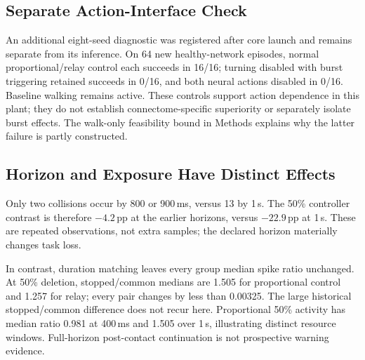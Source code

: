 \subsection{Separate Action-Interface Check}
An additional eight-seed diagnostic was registered after core launch and remains separate from its inference. On 64 new healthy-network episodes, normal proportional/relay control each succeeds in 16/16; turning disabled with burst triggering retained succeeds in 0/16, and both neural actions disabled in 0/16. Baseline walking remains active. These controls support action dependence in this plant; they do not establish connectome-specific superiority or separately isolate burst effects. The walk-only feasibility bound in Methods explains why the latter failure is partly constructed.

\subsection{Horizon and Exposure Have Distinct Effects}
Only two collisions occur by 800 or 900\,ms, versus 13 by 1\,s. The 50\% controller contrast is therefore $-4.2$\,pp at the earlier horizons, versus $-22.9$\,pp at 1\,s. These are repeated observations, not extra samples; the declared horizon materially changes task loss.

In contrast, duration matching leaves every group median spike ratio unchanged. At 50\% deletion, stopped/common medians are 1.505 for proportional control and 1.257 for relay; every pair changes by less than 0.00325. The large historical stopped/common difference does not recur here. Proportional 50\% activity has median ratio 0.981 at 400\,ms and 1.505 over 1\,s, illustrating distinct resource windows. Full-horizon post-contact continuation is not prospective warning evidence.
